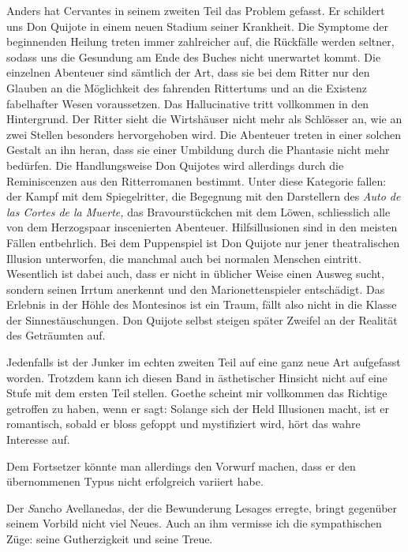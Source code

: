 Anders hat Cervantes in seinem zweiten Teil das Problem gefasst.
Er schildert uns Don Quijote in einem neuen Stadium seiner Krankheit.
Die Symptome der beginnenden Heilung treten immer zahlreicher auf,
die Rückfälle werden seltner, sodass uns die Gesundung am Ende des
Buches nicht unerwartet kommt. Die einzelnen Abenteuer sind sämtlich
der Art, dass sie bei dem Ritter nur den Glauben an die Möglichkeit
des fahrenden Rittertums und an die Existenz fabelhafter Wesen
voraussetzen. Das Hallucinative tritt vollkommen in den Hintergrund. Der
Ritter sieht die Wirtshäuser nicht mehr als Schlösser an, wie an zwei
Stellen besonders hervorgehoben wird. Die Abenteuer treten in einer
solchen Gestalt an ihn heran, dass sie einer Umbildung durch die
Phantasie nicht mehr bedürfen. Die Handlungsweise Don Quijotes wird
allerdings durch die Reminiscenzen aus den Ritterromanen bestimmt.
Unter diese Kategorie fallen: der Kampf mit dem Spiegelritter, die
Begegnung mit den Darstellern des {\it\spanish Auto de las Cortes de la Muerte,}
das Bravourstückchen mit dem Löwen, schliesslich alle von dem Herzogspaar
inscenierten Abenteuer. Hilfsillusionen sind in den meisten Fällen
entbehrlich. Bei dem Puppenspiel ist Don Quijote nur jener theatralischen
Illusion unterworfen, die manchmal auch bei normalen Menschen eintritt.
Wesentlich ist dabei auch, dass er nicht in üblicher Weise einen Ausweg
sucht, sondern seinen Irrtum anerkennt und den Marionettenspieler
entschädigt. Das Erlebnis in der Höhle des Montesinos ist ein Traum,
fällt also nicht in die Klasse der Sinnestäuschungen. Don Quijote
selbst steigen später Zweifel an der Realität des Geträumten auf.

Jedenfalls ist der Junker im echten zweiten Teil auf eine ganz neue
Art aufgefasst worden. Trotzdem kann ich diesen Band in ästhetischer
Hinsicht nicht auf eine Stufe mit dem ersten Teil stellen. Goethe scheint
mir vollkommen das Richtige getroffen zu haben, wenn er sagt: {\quoted Solange
sich der Held Illusionen macht, ist er romantisch, sobald er bloss gefoppt
und mystifiziert wird, hört das wahre Interesse auf}.

Dem Fortsetzer könnte man allerdings den Vorwurf machen, dass
er den übernommenen Typus nicht erfolgreich variiert habe.

Der {\emph Sancho} Avellanedas, der die Bewunderung Lesages erregte,
bringt gegenüber seinem Vorbild nicht viel Neues. Auch an ihm vermisse
ich die sympathischen Züge: seine Gutherzigkeit und seine Treue.


